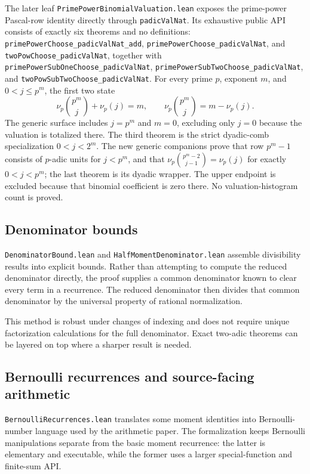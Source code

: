 \documentclass[11pt,oneside]{article}
\theoremstyle{definition}
\theoremstyle{remark}
\begin{document}
The later leaf \nolinkurl{PrimePowerBinomialValuation.lean} exposes the
prime-power Pascal-row identity directly through \nolinkurl{padicValNat}.  Its
exhaustive public API consists of exactly six theorems and no definitions:
\nolinkurl{primePowerChoose_padicValNat_add},
\nolinkurl{primePowerChoose_padicValNat}, and
\nolinkurl{twoPowChoose_padicValNat}, together with
\nolinkurl{primePowerSubOneChoose_padicValNat},
\nolinkurl{primePowerSubTwoChoose_padicValNat}, and
\nolinkurl{twoPowSubTwoChoose_padicValNat}.  For every prime \(p\), exponent \(m\), and
\(0<j\le p^m\), the first two state
\[
 \nu_p\!\binom{p^m}{j}+\nu_p(j)=m,
 \qquad
 \nu_p\!\binom{p^m}{j}=m-\nu_p(j).
\]
The generic surface includes \(j=p^m\) and \(m=0\), excluding only \(j=0\)
because the valuation is totalized there.  The third theorem is the strict
dyadic-comb specialization \(0<j<2^m\).  The new generic companions prove
that row \(p^m-1\) consists of \(p\)-adic units for \(j<p^m\), and that
\(\nu_p\binom{p^m-2}{j-1}=\nu_p(j)\) for exactly \(0<j<p^m\); the last theorem
is its dyadic wrapper.  The upper endpoint is excluded because that binomial
coefficient is zero there.  No valuation-histogram count is proved.

\subsection{Denominator bounds}
\nolinkurl{DenominatorBound.lean} and \nolinkurl{HalfMomentDenominator.lean} assemble divisibility results into explicit bounds.  Rather than attempting to compute the reduced denominator directly, the proof supplies a common denominator known to clear every term in a recurrence.  The reduced denominator then divides that common denominator by the universal property of rational normalization.

This method is robust under changes of indexing and does not require unique factorization calculations for the full denominator.  Exact two-adic theorems can be layered on top where a sharper result is needed.

\subsection{Bernoulli recurrences and source-facing arithmetic}
\nolinkurl{BernoulliRecurrences.lean} translates some moment identities into Bernoulli-number language used by the arithmetic paper.  The formalization keeps Bernoulli manipulations separate from the basic moment recurrence: the latter is elementary and executable, while the former uses a larger special-function and finite-sum API.
\end{document}
